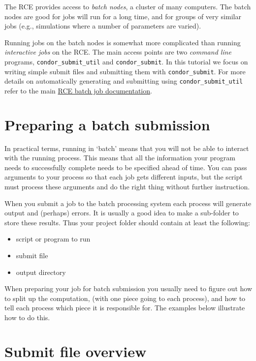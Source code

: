 \documentclass[
]{book}
\providecommand{\tightlist}{%
  \setlength{\itemsep}{0pt}\setlength{\parskip}{0pt}}
\begin{document}
The RCE provides access to \emph{batch nodes}, a cluster of many computers.
The batch nodes are good for jobs will run for a long time, and for
groups of very similar jobs (e.g., simulations where a number of
parameters are varied).

Running jobs on the batch nodes is somewhat more complicated than
running \emph{interactive jobs} on the RCE. The main access points are two
\emph{command line} programs, \texttt{condor\_submit\_util} and \texttt{condor\_submit}. In
this tutorial we focus on writing simple submit files and submitting
them with \texttt{condor\_submit}. For more details on automatically generating
and submitting using \texttt{condor\_submit\_util} refer to the main \href{http://projects.iq.harvard.edu/rce/book/batch-processing-basics}{RCE batch
job
documentation}.

\hypertarget{preparing-a-batch-submission}{%
\section{Preparing a batch submission}\label{preparing-a-batch-submission}}

In practical terms, running in `batch' means that you will not be able
to interact with the running process. This means that all the
information your program needs to successfully complete needs to be
specified ahead of time. You can pass arguments to your process so that
each job gets different inputs, but the script must process these
arguments and do the right thing without further instruction.

When you submit a job to the batch processing system each process will
generate output and (perhaps) errors. It is usually a good idea to make
a sub-folder to store these results. Thus your project folder should
contain at least the following:

\begin{itemize}
\tightlist
\item
  script or program to run
\item
  submit file
\item
  output directory
\end{itemize}

When preparing your job for batch submission you usually need to figure
out how to split up the computation, (with one piece going to each
process), and how to tell each process which piece it is responsible
for. The examples below illustrate how to do this.

\hypertarget{submit-file-overview}{%
\section{Submit file overview}\label{submit-file-overview}}
\end{document}
